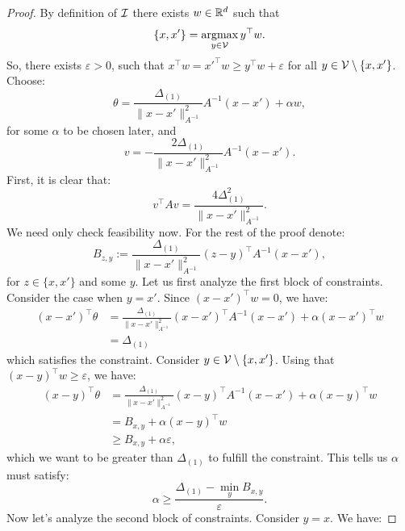 \begin{proof}
    By definition of $\mathcal{I}$ there exists $w \in \mathbb{R}^d$ such that \begin{equation}\{x,x'\} = \operatorname*{argmax}_{y \in \mathcal{V}} y^\top w.\end{equation} So, there exists $\varepsilon > 0$, such that $x^\top w =x'^\top w \geq y^\top w + \varepsilon $ for all $y \in \mathcal{V} \setminus \{x,x'\}$. Choose: \begin{equation}\theta =\frac{\Delta_{(1)}}{\|x-x'\|_{A^{-1}}^2}A^{-1}(x-x') + \alpha w,\end{equation} for some $\alpha$ to be chosen later, and \begin{equation}v = - \frac{2\Delta_{(1)}}{\|x-x'\|_{A^{-1}}^2}A^{-1}(x-x').\end{equation} First, it is clear that: \begin{equation}v^\top Av = \frac{4\Delta_{(1)}^2}{\|x - x'\|^2_{A^{-1}}}.\end{equation} We need only check feasibility now. For the rest of the proof denote: \begin{equation}B_{z,y} := \frac{\Delta_{(1)}}{\|x-x'\|_{A^{-1}}^2}(z- y)^\top A^{-1}(x-x'),\end{equation} for $z \in \{x,x'\}$ and some $y$. Let us first analyze the first block of constraints. Consider the case when $y = x'$. Since $(x -x')^\top w = 0$, we have: \begin{align*}
        (x - x')^\top\theta &= \frac{\Delta_{(1)}}{\|x-x'\|_{A^{-1}}^2}(x-x')^{\top}A^{-1}(x-x')+ \alpha(x -x')^\top w\\
        &= \Delta_{(1)}
    \end{align*}
    which satisfies the constraint. Consider $y \in \mathcal{V} \setminus \{x,x'\}$. Using that $(x -y)^\top w \geq \varepsilon$, we have: \begin{align*}
        (x - y)^\top\theta &= \frac{\Delta_{(1)}}{\|x-x'\|_{A^{-1}}^2}(x - y)^\top A^{-1}(x-x') + \alpha(x -y)^\top w\\
        &= B_{x,y} + \alpha(x -y)^\top w \\
        &\geq B_{x,y} + \alpha \varepsilon,
    \end{align*}
    which we want to be greater than $\Delta_{(1)}$ to fulfill the constraint. This tells us $\alpha $ must satisfy: \begin{equation}\alpha \geq \frac{\Delta_{(1)}- \min_{y}B_{x,y}}{\varepsilon}.\end{equation}
    Now let's analyze the second block of constraints. Consider $y=x$. We have:

\end{proof}
